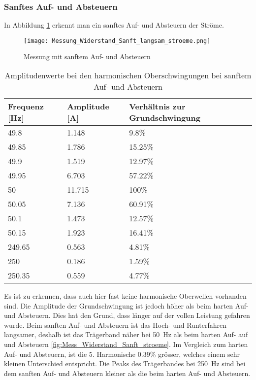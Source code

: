 \newpage
\subsubsection*{Sanftes Auf- und Absteuern}\label{sec:Sanft_Widerstand_stroeme}
In Abbildung \ref{fig:Mess_Widerstand_Sanft_langsam_stroeme} erkennt man ein sanftes Auf- und Absteuern der Ströme.

\begin{figure}[ht!]
	\centering
	\texttt{[image: Messung\_Widerstand\_Sanft\_langsam\_stroeme.png]}	
	\caption{Messung mit sanftem Auf- und Absteuern}\label{fig:Mess_Widerstand_Sanft_langsam_stroeme}
\end{figure}

\begin{table}[ht!]
	\centering
	\begin{tabular}{|l|l|l|}
		\hline
		Frequenz {[}Hz{]} & Amplitude {[}A{]} & Verhältnis zur Grundschwingung	\\ \hline
		49.8              & 1.148             & 9.8\%							\\ \hline
		49.85             & 1.786             & 15.25\%							\\ \hline
		49.9              & 1.519             & 12.97\%							\\ \hline
		49.95             & 6.703             & 57.22\%							\\ \hline
		50                & 11.715            & 100\%							\\ \hline
		50.05             & 7.136             & 60.91\%							\\ \hline
		50.1              & 1.473             & 12.57\%							\\ \hline
		50.15             & 1.923             & 16.41\%							\\ \hline
		249.65            & 0.563             & 4.81\%							\\ \hline
		250               & 0.186             & 1.59\%							\\ \hline
		250.35            & 0.559             & 4.77\%							\\ \hline
	\end{tabular}
	\caption{Amplitudenwerte bei den harmonischen Oberschwingungen bei sanftem Auf- und Absteuern}\label{tab:Sanft_langsam_stroeme}
\end{table}
Es ist zu erkennen, dass auch hier fast keine harmonische Oberwellen vorhanden sind. Die Amplitude der Grundschwingung ist jedoch höher als beim harten Auf- und Absteuern. Dies hat den Grund, dass länger auf der vollen Leistung gefahren wurde. Beim sanften Auf- und Absteuern ist das Hoch- und Runterfahren langsamer, deshalb ist das Trägerband näher bei \SI{50}{Hz} als beim harten Auf- auf und Absteuern \ref{fig:Mess_Widerstand_Sanft_stroeme}. Im Vergleich zum harten Auf- und Absteuern, ist die 5. Harmonische 0.39\% grösser, welches einem sehr kleinen Unterschied entspricht. Die Peaks des Trägerbandes bei \SI{250}{Hz} sind bei dem sanften Auf- und Absteuern kleiner als die beim harten Auf- und Absteuern.



